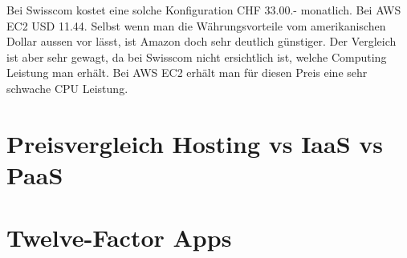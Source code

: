 Bei Swisscom kostet eine solche Konfiguration CHF 33.00.- monatlich. Bei AWS EC2 USD 11.44. Selbst wenn man die Währungsvorteile vom amerikanischen Dollar aussen vor lässt, ist Amazon doch sehr deutlich günstiger. Der Vergleich ist aber sehr gewagt, da bei Swisscom nicht ersichtlich ist, welche Computing Leistung man erhält. Bei AWS EC2 erhält man für diesen Preis eine sehr schwache CPU Leistung.

\chapter{Preisvergleich Hosting vs IaaS vs PaaS}
\chapter{Twelve-Factor Apps}

